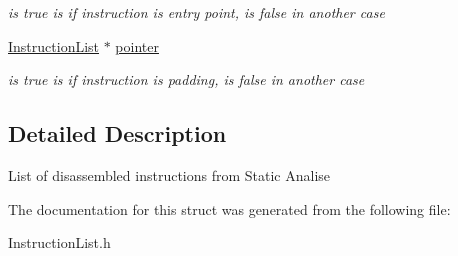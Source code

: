 \begin{DoxyCompactItemize}
\begin{DoxyCompactList}\small\item\em is true is if instruction is entry point, is false in another case \item\end{DoxyCompactList}\item 
\hypertarget{structInstructionList_a675df0f2d0763aebc20a81b10f8b09c6}{
\hyperlink{structInstructionList}{InstructionList} $\ast$ \hyperlink{structInstructionList_a675df0f2d0763aebc20a81b10f8b09c6}{pointer}}
\label{structInstructionList_a675df0f2d0763aebc20a81b10f8b09c6}

\begin{DoxyCompactList}\small\item\em is true is if instruction is padding, is false in another case \item\end{DoxyCompactList}\end{DoxyCompactItemize}


\subsection{Detailed Description}
List of disassembled instructions from Static Analise 

The documentation for this struct was generated from the following file:\begin{DoxyCompactItemize}
\item 
InstructionList.h\end{DoxyCompactItemize}
